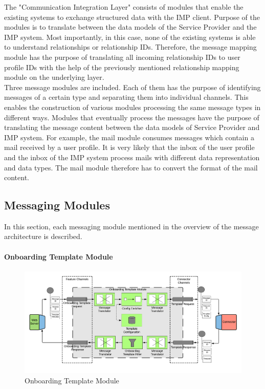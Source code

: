 The "Communication Integration Layer" consists of modules that enable the existing systems to exchange structured data with the IMP client. Purpose of the modules is to translate between the data models of the Service Provider and the IMP system. Most importantly, in this case, none of the existing systems is able to understand relationships or relationship IDs. Therefore, the message mapping module has the purpose of translating all incoming relationship IDs to user profile IDs with the help of the previously mentioned relationship mapping module on the underlying layer. \\
Three message modules are included. Each of them has the purpose of identifying messages of a certain type and separating them into individual channels. This enables the construction of various modules processing the same message types in different ways. Modules that eventually process the messages have the purpose of translating the message content between the data models of Service Provider and IMP system. For example, the mail module consumes messages which contain a mail received by a user profile. It is very likely that the inbox of the user profile and the inbox of the IMP system process mails with different data representation and data types. The mail module therefore has to convert the format of the mail content.

\subsection{Messaging Modules}

In this section, each messaging module mentioned in the overview of the message architecture is described.

\paragraph{Onboarding Template Module}

\begin{figure}[h!]
    \centering
    \includegraphics[scale=0.6]{Diagrams/Integration Architecture 1/Technological Integration/6. Onboarding Template Module.pdf}
    \caption{Onboarding Template Module}
    \label{integration1:onboarding_template_module}
\end{figure}

